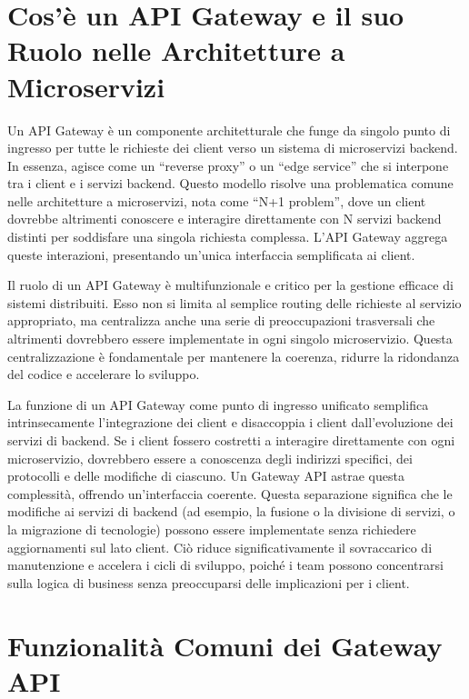 \section{Cos'è un API Gateway e il suo Ruolo nelle Architetture a Microservizi}

Un API Gateway è un componente architetturale che funge da singolo punto di ingresso per tutte le richieste dei client verso un sistema di microservizi backend. In essenza, agisce come un \enquote{reverse proxy} o un \enquote{edge service} che si interpone tra i client e i servizi backend. Questo modello risolve una problematica comune nelle architetture a microservizi, nota come \enquote{N+1 problem}, dove un client dovrebbe altrimenti conoscere e interagire direttamente con N servizi backend distinti per soddisfare una singola richiesta complessa. L'API Gateway aggrega queste interazioni, presentando un'unica interfaccia semplificata ai client.

Il ruolo di un API Gateway è multifunzionale e critico per la gestione efficace di sistemi distribuiti. Esso non si limita al semplice routing delle richieste al servizio appropriato, ma centralizza anche una serie di preoccupazioni trasversali che altrimenti dovrebbero essere implementate in ogni singolo microservizio. Questa centralizzazione è fondamentale per mantenere la coerenza, ridurre la ridondanza del codice e accelerare lo sviluppo.

La funzione di un API Gateway come punto di ingresso unificato semplifica intrinsecamente l'integrazione dei client e disaccoppia i client dall'evoluzione dei servizi di backend. Se i client fossero costretti a interagire direttamente con ogni microservizio, dovrebbero essere a conoscenza degli indirizzi specifici, dei protocolli e delle modifiche di ciascuno. Un Gateway API astrae questa complessità, offrendo un'interfaccia coerente. Questa separazione significa che le modifiche ai servizi di backend (ad esempio, la fusione o la divisione di servizi, o la migrazione di tecnologie) possono essere implementate senza richiedere aggiornamenti sul lato client. Ciò riduce significativamente il sovraccarico di manutenzione e accelera i cicli di sviluppo, poiché i team possono concentrarsi sulla logica di business senza preoccuparsi delle implicazioni per i client.

\section{Funzionalità Comuni dei Gateway API}

